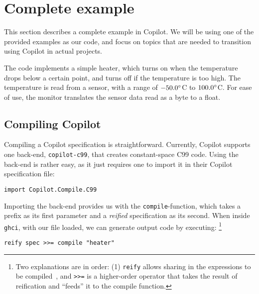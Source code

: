\section{Complete example}
\label{sec:complete_example}
This section describes a complete example in Copilot. We will be using
one of the provided examples as our code, and focus on topics that are 
needed to transition using Copilot in actual projects.


The code implements a simple heater, which turns on when the temperature drops
below a certain point, and turns off if the temperature is too high. The
temperature is read from a sensor, with a range of
$-50.0\degree$C to $100.0\degree$C. For ease of use, the monitor translates the
sensor data read as a byte to a float.

\subsection{Compiling Copilot} \label{sec:compiling}

Compiling a Copilot specification is straightforward. Currently, Copilot
supports one back-end, \texttt{copilot-c99}, that creates constant-space C99
code. Using the back-end is rather easy, as it just requires one to import it in
their Copilot specification file:

\begin{lstlisting}[language = Copilot]
import Copilot.Compile.C99
\end{lstlisting}

Importing the back-end provides us with the \texttt{compile}-function, which
takes a prefix as its first parameter and a \textit{reified} specification as
its second. When inside \texttt{ghci}, with our file loaded, we can generate
output code by executing:
\footnote{Two explanations are in order: (1) {\tt reify} allows sharing in the
expressions to be compiled~\cite{DSLExtract}, and {\tt >>=} is a higher-order
operator that takes the result of reification and ``feeds'' it to the compile
function.}
\begin{lstlisting}[language = Copilot]
reify spec >>= compile "heater"
\end{lstlisting}

